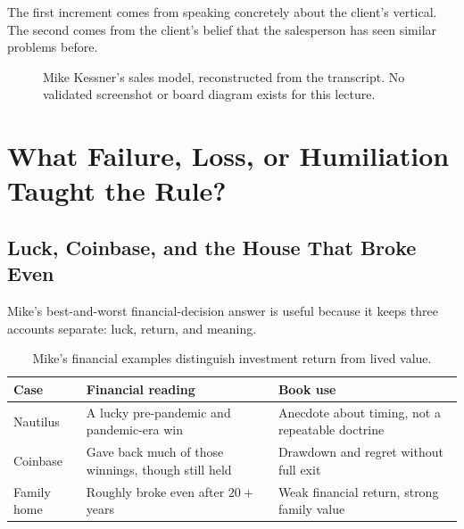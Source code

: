 \documentclass[11pt,oneside]{book}
\begin{document}
The first increment comes from speaking concretely about the client's vertical. The second comes from the client's belief that the salesperson has seen similar problems before.

\begin{figure}
\centering
{}
\caption{Mike Kessner's sales model, reconstructed from the transcript. No validated screenshot or board diagram exists for this lecture.}
\end{figure}

\chapter{What Failure, Loss, or Humiliation Taught the Rule?}

\section{Luck, Coinbase, and the House That Broke Even}

Mike's best-and-worst financial-decision answer is useful because it keeps three accounts separate: luck, return, and meaning.

\begin{table}
\centering
\begin{tabular}{p{.24\linewidth}p{.34\linewidth}p{.31\linewidth}}
\hline
Case & Financial reading & Book use \\
\hline
Nautilus & A lucky pre-pandemic and pandemic-era win & Anecdote about timing, not a repeatable doctrine \\
Coinbase & Gave back much of those winnings, though still held & Drawdown and regret without full exit \\
Family home & Roughly broke even after \(20+\) years & Weak financial return, strong family value \\
\hline
\end{tabular}
\caption{Mike's financial examples distinguish investment return from lived value.}
\end{table}
\end{document}
